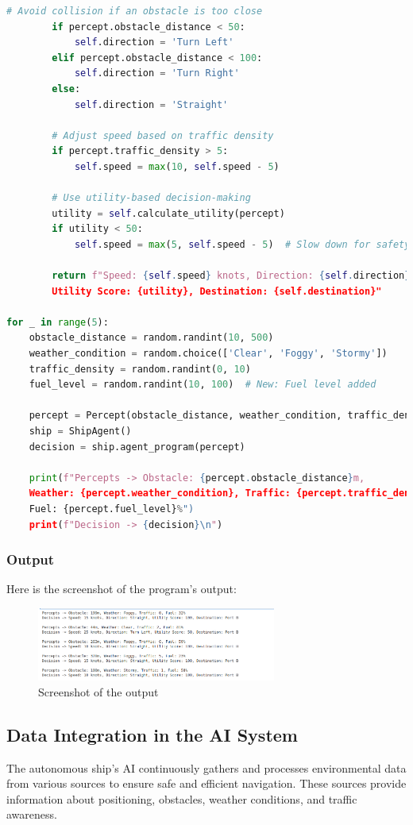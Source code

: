 \documentclass{article}
\begin{document}
\begin{lstlisting}[language=Python, caption={AI Agent for Autonomous Ship Navigation}]
        # Avoid collision if an obstacle is too close
        if percept.obstacle_distance < 50:
            self.direction = 'Turn Left'
        elif percept.obstacle_distance < 100:
            self.direction = 'Turn Right'
        else:
            self.direction = 'Straight'
        
        # Adjust speed based on traffic density
        if percept.traffic_density > 5:
            self.speed = max(10, self.speed - 5)

        # Use utility-based decision-making
        utility = self.calculate_utility(percept)
        if utility < 50:
            self.speed = max(5, self.speed - 5)  # Slow down for safety
        
        return f"Speed: {self.speed} knots, Direction: {self.direction}, 
        Utility Score: {utility}, Destination: {self.destination}"

for _ in range(5): 
    obstacle_distance = random.randint(10, 500)  
    weather_condition = random.choice(['Clear', 'Foggy', 'Stormy'])
    traffic_density = random.randint(0, 10)  
    fuel_level = random.randint(10, 100)  # New: Fuel level added
    
    percept = Percept(obstacle_distance, weather_condition, traffic_density, fuel_level)
    ship = ShipAgent()
    decision = ship.agent_program(percept)
    
    print(f"Percepts -> Obstacle: {percept.obstacle_distance}m, 
    Weather: {percept.weather_condition}, Traffic: {percept.traffic_density}, 
    Fuel: {percept.fuel_level}%")
    print(f"Decision -> {decision}\n")
\end{lstlisting}
\subsubsection{Output}
Here is the screenshot of the program's output:

\begin{figure}[h!]
    \centering
    \includegraphics[width=0.7\textwidth]{1_a.png} 
    \caption{Screenshot of the output}
\end{figure}

\subsection{Data Integration in the AI System}
The autonomous ship’s AI continuously gathers and processes environmental data from various sources to ensure safe and efficient navigation. These sources provide information about positioning, obstacles, weather conditions, and traffic awareness.
\end{document}

